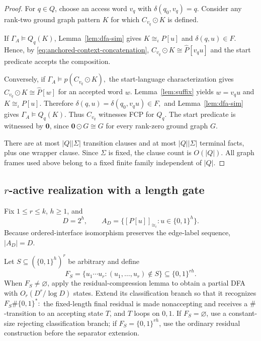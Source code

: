 \documentclass[11pt]{article}
\theoremstyle{definition}
\theoremstyle{remark}
\begin{document}
\begin{proof}
For \(q\in Q\), choose an access word \(v_q\) with
\(\delta(q_0,v_q)=q\). Consider any rank-two ground graph pattern \(K\) for
which \(C_{v_q}\odot K\) is defined.

If \(\Gamma_A\models Q_q(K)\), Lemma~\ref{lem:dfa-sim} gives
\(K\cong_\iota P[u]\) and \(\delta(q,u)\in F\). Hence, by
\eqref{eq:anchored-context-concatenation},
\(C_{v_q}\odot K\cong\widehat P[v_qu]\)
and the start predicate accepts the composition.

Conversely, if
\(\Gamma_A\models p(C_{v_q}\odot K),\)
the start-language characterization gives
\(C_{v_q}\odot K\cong\widehat P[w]\) for an accepted word \(w\).
Lemma~\ref{lem:suffix} yields \(w=v_qu\) and \(K\cong_\iota P[u]\). Therefore
\(\delta(q,u)=\delta(q_0,v_qu)\in F,\)
and Lemma~\ref{lem:dfa-sim} gives \(\Gamma_A\models Q_q(K)\).
Thus \(C_{v_q}\) witnesses FCP for \(Q_q\). The start predicate is witnessed
by \(\mathbf 0\), since \(\mathbf 0\odot G\cong G\) for every rank-zero
ground graph \(G\).

There are at most \(|Q||\Sigma|\) transition clauses and at most
\(|Q||\Sigma|\) terminal facts, plus one wrapper clause. Since \(\Sigma\) is
fixed, the clause count is \(O(|Q|)\). All graph frames used above belong to a
fixed finite family independent of \(|Q|\).
\end{proof}

\subsection{\texorpdfstring{$r$-active realization with a length gate}{r-active realization with a length gate}}

Fix \(1\le r\le k\), \(h\ge1\), and
\[
D=2^h,
\qquad
A_D=\{[P[u]]_{\cong_\iota}:u\in\{0,1\}^h\}.
\]
Because ordered-interface isomorphism preserves the edge-label sequence,
\(|A_D|=D\).

Let
\(S\subseteq(\{0,1\}^h)^r\)
be arbitrary and define
\[
F_S=
\{u_1\cdots u_r:(u_1,\ldots,u_r)\notin S\}
\subseteq\{0,1\}^{rh}.
\]
When \(F_S\ne\varnothing\), apply the residual-compression lemma to obtain a
partial DFA with
\(O_r(D^r/\log D)\)
states. Extend its classification branch so that it recognizes
\(F_S\#\{0,1\}^*:\)
the fixed-length final residual is made nonaccepting and receives a
\(\#\)-transition to an accepting state \(T\), and \(T\) loops on \(0,1\).
If \(F_S=\varnothing\), use a constant-size rejecting classification branch;
if \(F_S=\{0,1\}^{rh}\), use the ordinary residual construction before the
separator extension.
\end{document}
